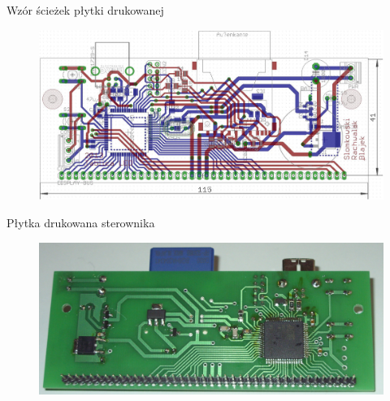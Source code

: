 \documentclass{beamer}
\begin{document}
\begin{frame}{Wzór ścieżek płytki drukowanej}
	\begin{figure}[h]
		\centering
		\includegraphics[scale=0.2]{img/schemat.jpg}
	\end{figure}
\end{frame}

\begin{frame}{Płytka drukowana sterownika}
	\begin{figure}[h]
		\centering
		\includegraphics[width=\textwidth]{img/zdj-sterownik-down.jpg}
	\end{figure}
\end{frame}
\end{document}
